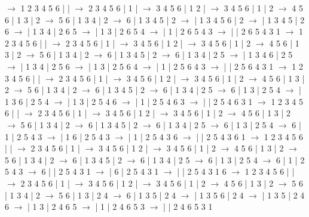 \documentclass{article}
\begin{document}
\newline
 $\rightarrow$ 1 2 3 4 5 6 |  |  $\rightarrow$ 2 3 4 5 6 | 1 |  $\rightarrow$ 3 4 5 6 | 1 2 |  $\rightarrow$ 3 4 5 6 | 1 | 2 $\rightarrow$ 4 5 6 | 1 3 | 2 $\rightarrow$ 5 6 | 1 3 4 | 2 $\rightarrow$ 6 | 1 3 4 5 | 2 $\rightarrow$  | 1 3 4 5 6 | 2 $\rightarrow$  | 1 3 4 5 | 2 6 $\rightarrow$  | 1 3 4 | 2 6 5 $\rightarrow$  | 1 3 | 2 6 5 4 $\rightarrow$  | 1 | 2 6 5 4 3 $\rightarrow$  |  | 2 6 5 4 3 1
\newline
 $\rightarrow$ 1 2 3 4 5 6 |  |  $\rightarrow$ 2 3 4 5 6 | 1 |  $\rightarrow$ 3 4 5 6 | 1 2 |  $\rightarrow$ 3 4 5 6 | 1 | 2 $\rightarrow$ 4 5 6 | 1 3 | 2 $\rightarrow$ 5 6 | 1 3 4 | 2 $\rightarrow$ 6 | 1 3 4 5 | 2 $\rightarrow$ 6 | 1 3 4 | 2 5 $\rightarrow$  | 1 3 4 6 | 2 5 $\rightarrow$  | 1 3 4 | 2 5 6 $\rightarrow$  | 1 3 | 2 5 6 4 $\rightarrow$  | 1 | 2 5 6 4 3 $\rightarrow$  |  | 2 5 6 4 3 1
\newline
 $\rightarrow$ 1 2 3 4 5 6 |  |  $\rightarrow$ 2 3 4 5 6 | 1 |  $\rightarrow$ 3 4 5 6 | 1 2 |  $\rightarrow$ 3 4 5 6 | 1 | 2 $\rightarrow$ 4 5 6 | 1 3 | 2 $\rightarrow$ 5 6 | 1 3 4 | 2 $\rightarrow$ 6 | 1 3 4 5 | 2 $\rightarrow$ 6 | 1 3 4 | 2 5 $\rightarrow$ 6 | 1 3 | 2 5 4 $\rightarrow$  | 1 3 6 | 2 5 4 $\rightarrow$  | 1 3 | 2 5 4 6 $\rightarrow$  | 1 | 2 5 4 6 3 $\rightarrow$  |  | 2 5 4 6 3 1
\newline
 $\rightarrow$ 1 2 3 4 5 6 |  |  $\rightarrow$ 2 3 4 5 6 | 1 |  $\rightarrow$ 3 4 5 6 | 1 2 |  $\rightarrow$ 3 4 5 6 | 1 | 2 $\rightarrow$ 4 5 6 | 1 3 | 2 $\rightarrow$ 5 6 | 1 3 4 | 2 $\rightarrow$ 6 | 1 3 4 5 | 2 $\rightarrow$ 6 | 1 3 4 | 2 5 $\rightarrow$ 6 | 1 3 | 2 5 4 $\rightarrow$ 6 | 1 | 2 5 4 3 $\rightarrow$  | 1 6 | 2 5 4 3 $\rightarrow$  | 1 | 2 5 4 3 6 $\rightarrow$  |  | 2 5 4 3 6 1
\newline
 $\rightarrow$ 1 2 3 4 5 6 |  |  $\rightarrow$ 2 3 4 5 6 | 1 |  $\rightarrow$ 3 4 5 6 | 1 2 |  $\rightarrow$ 3 4 5 6 | 1 | 2 $\rightarrow$ 4 5 6 | 1 3 | 2 $\rightarrow$ 5 6 | 1 3 4 | 2 $\rightarrow$ 6 | 1 3 4 5 | 2 $\rightarrow$ 6 | 1 3 4 | 2 5 $\rightarrow$ 6 | 1 3 | 2 5 4 $\rightarrow$ 6 | 1 | 2 5 4 3 $\rightarrow$ 6 |  | 2 5 4 3 1 $\rightarrow$  | 6 | 2 5 4 3 1 $\rightarrow$  |  | 2 5 4 3 1 6
\newline
 $\rightarrow$ 1 2 3 4 5 6 |  |  $\rightarrow$ 2 3 4 5 6 | 1 |  $\rightarrow$ 3 4 5 6 | 1 2 |  $\rightarrow$ 3 4 5 6 | 1 | 2 $\rightarrow$ 4 5 6 | 1 3 | 2 $\rightarrow$ 5 6 | 1 3 4 | 2 $\rightarrow$ 5 6 | 1 3 | 2 4 $\rightarrow$ 6 | 1 3 5 | 2 4 $\rightarrow$  | 1 3 5 6 | 2 4 $\rightarrow$  | 1 3 5 | 2 4 6 $\rightarrow$  | 1 3 | 2 4 6 5 $\rightarrow$  | 1 | 2 4 6 5 3 $\rightarrow$  |  | 2 4 6 5 3 1
\end{document}
